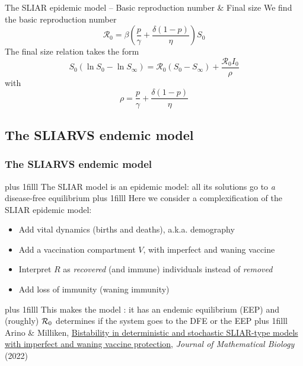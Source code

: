 \documentclass[aspectratio=169]{beamer}\usepackage[]{graphicx}\usepackage[]{xcolor}
\begin{document}
\begin{frame}{The SLIAR epidemic model -- Basic reproduction number \& Final size}
We find the basic reproduction number
\begin{equation}\label{eq:R0-SLIAR}
\mathcal{R}_0=\beta
\left(
\frac{p}{\gamma}+\frac{\delta(1-p)}{\eta}
\right)S_0
\end{equation}
\vfill
The final size relation takes the form
\begin{equation}\label{eq:final-size}
S_0(\ln S_0-\ln S_\infty) =
\mathcal{R}_0(S_0-S_\infty)+\frac{\mathcal{R}_0I_0}{\rho}
\end{equation}
with 
\[
\rho=\frac{p}{\gamma}+\frac{\delta(1-p)}{\eta}
\]
\end{frame}

\subsection{The SLIARVS endemic model}

\begin{frame}\frametitle{The SLIARVS endemic model}
\vskip0pt plus 1filll
The SLIAR model is an epidemic model: all its solutions go to \emph{a} disease-free equilibrium
\vskip0pt plus 1filll
Here we consider a complexification of the SLIAR epidemic model:
\begin{itemize}
\item Add vital dynamics (births and deaths), a.k.a. demography
\item Add a vaccination compartment $V$, with imperfect and waning vaccine
\item Interpret $R$ as \emph{recovered} (and immune) individuals instead of \emph{removed}
\item Add loss of immunity (waning immunity)
\end{itemize}
\vskip0pt plus 1filll
This makes the model : it has an endemic equilibrium (EEP) and (roughly) $\mathcal{R}_0$ determines if the system goes to the DFE or the EEP
\vskip0pt plus 1filll
\tiny
Arino \& Milliken, \href{https://doi.org/10.1007/s00285-022-01765-9}{Bistability in deterministic and stochastic SLIAR-type models with imperfect and waning vaccine protection}, \emph{Journal of Mathematical Biology} (2022)
\end{frame}
\end{document}
